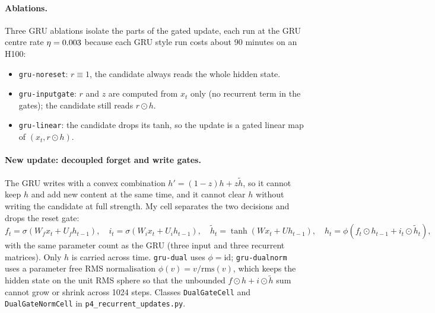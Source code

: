 \paragraph{Ablations.} Three GRU ablations isolate the parts of the gated update, each run at the GRU centre rate $\eta=0.003$ because each GRU style run costs about 90 minutes on an H100:
\begin{itemize}\setlength\itemsep{0pt}
  \item \texttt{gru-noreset}: $r\equiv 1$, the candidate always reads the whole hidden state.
  \item \texttt{gru-inputgate}: $r$ and $z$ are computed from $x_t$ only (no recurrent term in the gates); the candidate still reads $r\odot h$.
  \item \texttt{gru-linear}: the candidate drops its tanh, so the update is a gated linear map of $(x_t, r\odot h)$.
\end{itemize}

\paragraph{New update: decoupled forget and write gates.} The GRU writes with a convex combination $h' = (1-z)h + z\tilde h$, so it cannot keep $h$ and add new content at the same time, and it cannot clear $h$ without writing the candidate at full strength. My cell separates the two decisions and drops the reset gate:
\[
f_t = \sigma(W_f x_t + U_f h_{t-1}),\quad i_t = \sigma(W_i x_t + U_i h_{t-1}),\quad \tilde h_t = \tanh(W x_t + U h_{t-1}),\quad h_t = \phi\!\left(f_t\odot h_{t-1} + i_t\odot \tilde h_t\right),
\]
with the same parameter count as the GRU (three input and three recurrent matrices). Only $h$ is carried across time. \texttt{gru-dual} uses $\phi = \mathrm{id}$; \texttt{gru-dualnorm} uses a parameter free RMS normalisation $\phi(v) = v/\mathrm{rms}(v)$, which keeps the hidden state on the unit RMS sphere so that the unbounded $f\odot h + i\odot\tilde h$ sum cannot grow or shrink across 1024 steps. Classes \texttt{DualGateCell} and \texttt{DualGateNormCell} in \texttt{p4\_recurrent\_updates.py}.
